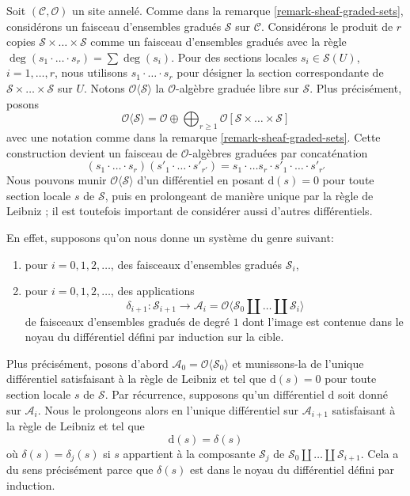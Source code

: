 \medskip\noindent
Soit $(\mathcal{C}, \mathcal{O})$ un site annelé.
Comme dans la remarque \ref{remark-sheaf-graded-sets}, considérons un faisceau d'ensembles gradués $\mathcal{S}$ sur $\mathcal{C}$.
Considérons le produit de $r$ copies $\mathcal{S} \times \ldots \times \mathcal{S}$ comme un faisceau d'ensembles gradués avec la règle $\deg(s_1 \cdot \ldots \cdot s_r) = \sum \deg(s_i)$.
Pour des sections locales $s_i \in \mathcal{S}(U)$, $i = 1, \ldots, r$, nous utilisons $s_1 \cdot \ldots \cdot s_r$ pour désigner la section correspondante de $\mathcal{S} \times \ldots \times \mathcal{S}$ sur $U$.
Notons $\mathcal{O}\langle \mathcal{S} \rangle$ la $\mathcal{O}$-algèbre graduée libre sur $\mathcal{S}$.
Plus précisément, posons
$$
\mathcal{O}\langle \mathcal{S} \rangle =
\mathcal{O} \oplus
\bigoplus\nolimits_{r \geq 1}
\mathcal{O}[\mathcal{S} \times \ldots \times \mathcal{S}]
$$
avec une notation comme dans la remarque \ref{remark-sheaf-graded-sets}.
Cette construction devient un faisceau de $\mathcal{O}$-algèbres graduées par concaténation
$$
(s_1 \cdot \ldots \cdot s_r)  (s'_1 \cdot \ldots \cdot s'_{r'}) =
s_1 \cdot \ldots s_r \cdot s'_1 \cdot \ldots \cdot s'_{r'}
$$
Nous pouvons munir $\mathcal{O}\langle \mathcal{S} \rangle$ d'un différentiel en posant $\text{d}(s) = 0$ pour toute section locale $s$ de $\mathcal{S}$, puis en prolongeant de manière unique par la règle de Leibniz ; il est toutefois important de considérer aussi d'autres différentiels.

\medskip\noindent
En effet, supposons qu'on nous donne un système du genre suivant:
\begin{enumerate}
\item pour $i = 0, 1, 2, \ldots$, des faisceaux d'ensembles gradués $\mathcal{S}_i$, \item pour $i = 0, 1, 2, \ldots$, des applications
$$
\delta_{i + 1} : \mathcal{S}_{i + 1}
\longrightarrow
\mathcal{A}_i =
\mathcal{O}\langle \mathcal{S}_0 \amalg \ldots \amalg \mathcal{S}_i\rangle
$$
de faisceaux d'ensembles gradués de degré $1$ dont l'image est contenue dans le noyau du différentiel défini par induction sur la cible.
\end{enumerate}
Plus précisément, posons d'abord $\mathcal{A}_0 = \mathcal{O}\langle \mathcal{S}_0 \rangle$ et munissons-la de l'unique différentiel satisfaisant à la règle de Leibniz et tel que $\text{d}(s) = 0$ pour toute section locale $s$ de $\mathcal{S}$.
Par récurrence, supposons qu'un différentiel $\text{d}$ soit donné sur $\mathcal{A}_i$.
Nous le prolongeons alors en l'unique différentiel sur $\mathcal{A}_{i + 1}$ satisfaisant à la règle de Leibniz et tel que
$$
\text{d}(s) = \delta(s)
$$
où $\delta(s) = \delta_j(s)$ si $s$ appartient à la composante $\mathcal{S}_j$ de $\mathcal{S}_0 \amalg \ldots \amalg \mathcal{S}_{i + 1}$.
Cela a du sens précisément parce que $\delta(s)$ est dans le noyau du différentiel défini par induction.

